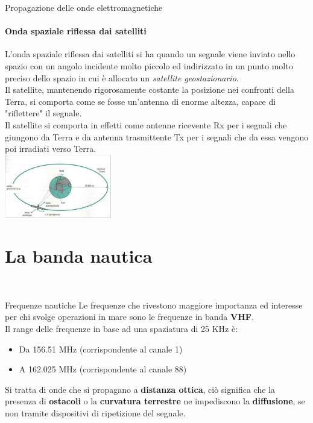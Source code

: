 \documentclass[aspectratio=169]{beamer}
\newcommand*{\vet}{\fontfamily{qzc}\selectfont}
\begin{document}
\begin{frame}{Propagazione delle onde elettromagnetiche}
	\framesubtitle{Onda spaziale riflessa dai satelliti}
	L'onda spaziale riflessa dai satelliti si ha quando un segnale viene inviato nello spazio con un angolo incidente molto piccolo ed indirizzato in un punto molto preciso dello spazio in cui è allocato un \emph{satellite geostazionario}.\\
	Il satellite, mantenendo rigorosamente costante la posizione nei confronti della Terra, si comporta come se fosse un'antenna di enorme altezza, capace di "riflettere" il segnale.\\
	Il satellite si comporta in effetti come antenne ricevente {\vet Rx} per i segnali che giungono da Terra e da antenna trasmittente {\vet Tx} per i segnali che da essa vengono poi irradiati verso Terra.\\
	\medskip
	\centering
	\includegraphics[width=0.35\textwidth]{Imgs/OndaSatellitare}
\end{frame}

\section{La banda nautica}
\begin{frame}
	\\
\end{frame}

\begin{frame}{Frequenze nautiche}
	Le frequenze che rivestono maggiore importanza ed interesse per chi svolge operazioni in mare sono le frequenze in banda \textbf{VHF}.\\
	\smallskip
	Il range delle frequenze in base ad una spaziatura di 25 KHz è:\\
	\begin{itemize}
		\item Da 156.51 MHz (corrispondente al canale 1)
		\item A 162.025 MHz (corrispondente al canale 88)
	\end{itemize}
\smallskip
Si tratta di onde che si propagano a \textbf{distanza ottica}, ciò significa che la presenza di \textbf{ostacoli} o la \textbf{curvatura terrestre} ne impediscono la \textbf{diffusione}, se non tramite dispositivi di ripetizione del segnale.\\
\end{frame}
\end{document}
